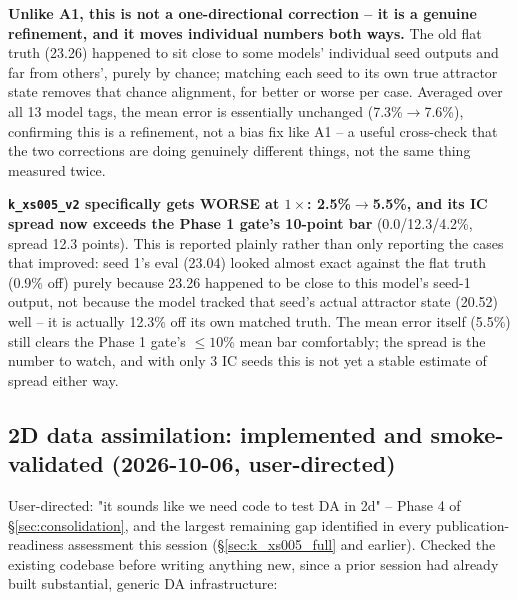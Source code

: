 \documentclass[11pt]{article}
\begin{document}
\textbf{Unlike A1, this is not a one-directional correction -- it is a
genuine refinement, and it moves individual numbers both ways.} The
old flat truth (23.26) happened to sit close to some models' individual
seed outputs and far from others', purely by chance; matching each
seed to its own true attractor state removes that chance alignment, for
better or worse per case. Averaged over all 13 model tags, the mean
error is essentially unchanged (7.3\%$\to$7.6\%), confirming this is a
refinement, not a bias fix like A1 -- a useful cross-check that the two
corrections are doing genuinely different things, not the same thing
measured twice.

\textbf{\texttt{k\_xs005\_v2} specifically gets WORSE at $1\times$: 2.5\%$\to$5.5\%,
and its IC spread now exceeds the Phase 1 gate's 10-point bar}
(0.0/12.3/4.2\%, spread 12.3 points). This is reported plainly rather
than only reporting the cases that improved: seed 1's eval
(23.04) looked almost exact against the flat truth (0.9\% off) purely
because 23.26 happened to be close to this model's seed-1 output, not
because the model tracked that seed's actual attractor state (20.52)
well -- it is actually 12.3\% off its own matched truth. The mean error
itself (5.5\%) still clears the Phase 1 gate's $\le10\%$ mean bar
comfortably; the spread is the number to watch, and with only 3 IC
seeds this is not yet a stable estimate of spread either way.

\subsection{2D data assimilation: implemented and smoke-validated
(2026-10-06, user-directed)}
\label{sec:da_2d}

User-directed: "it sounds like we need code to test DA in 2d" --
Phase 4 of \S\ref{sec:consolidation}, and the largest remaining gap
identified in every publication-readiness assessment this session
(\S\ref{sec:k_xs005_full} and earlier). Checked the existing codebase
before writing anything new, since a prior session had already built
substantial, generic DA infrastructure:
\end{document}
